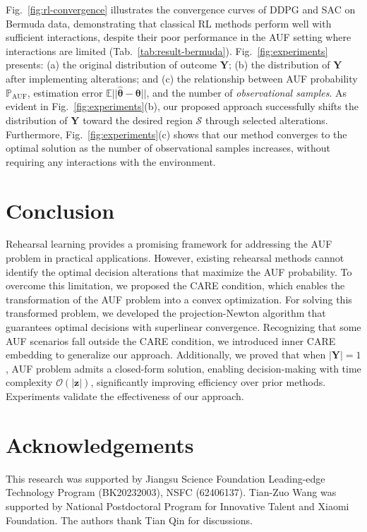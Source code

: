 \documentclass{article}
\theoremstyle{plain}
\theoremstyle{definition}
\def \Y{\mathbf{Y}}
\def \sS {\mathcal{S}}
\def \Y {\mathbf{Y}}
\def \z {\mathbf{z}}
\begin{document}
Fig.~\ref{fig:rl-convergence} illustrates the convergence curves of DDPG and SAC on Bermuda data, demonstrating that classical RL methods perform well with sufficient interactions, despite their poor performance in the AUF setting where interactions are limited (Tab.~\ref{tab:result-bermuda}). Fig.~\ref{fig:experiments} presents: (a) the original distribution of outcome $\Y$; (b) the distribution of $\Y$ after implementing alterations; and (c) the relationship between AUF probability $\mathbb{P}_{\operatorname*{AUF}}$, estimation error $\mathbb{E}||\hat{\bm{\theta}}-\bm{\theta}||$, and the number of \emph{observational samples}.
As evident in Fig.~\ref{fig:experiments}(b), our proposed approach successfully shifts the distribution of $\Y$ toward the desired region $\sS$ through selected alterations.
Furthermore, Fig.~\ref{fig:experiments}(c) shows that our method converges to the optimal solution as the number of observational samples increases, without requiring any interactions with the environment.
 



 

\section{Conclusion}
\label{sec:conclusion}


Rehearsal learning provides a promising framework for addressing the AUF problem in practical applications. 
However, existing rehearsal methods cannot identify the optimal decision alterations that maximize the AUF probability.  
To overcome this limitation, we proposed the CARE condition, which enables the transformation of the AUF problem into a convex optimization. 
For solving this transformed problem, we developed the projection-Newton algorithm that guarantees optimal decisions with superlinear convergence.  
Recognizing that some AUF scenarios fall outside the CARE condition, we introduced inner CARE embedding to generalize our approach. 
Additionally, we proved that when $|\Y| = 1$, AUF problem admits a closed-form solution, enabling decision-making with time complexity $\mathcal{O}(|\z|)$, significantly improving efficiency over prior methods. 
Experiments validate the effectiveness of our approach.  


\section*{Acknowledgements}
This research was supported by Jiangsu Science Foundation Leading-edge Technology Program (BK20232003), NSFC (62406137). Tian-Zuo Wang was supported by National Postdoctoral Program for Innovative Talent and Xiaomi Foundation. The authors thank Tian Qin for discussions.
\end{document}
